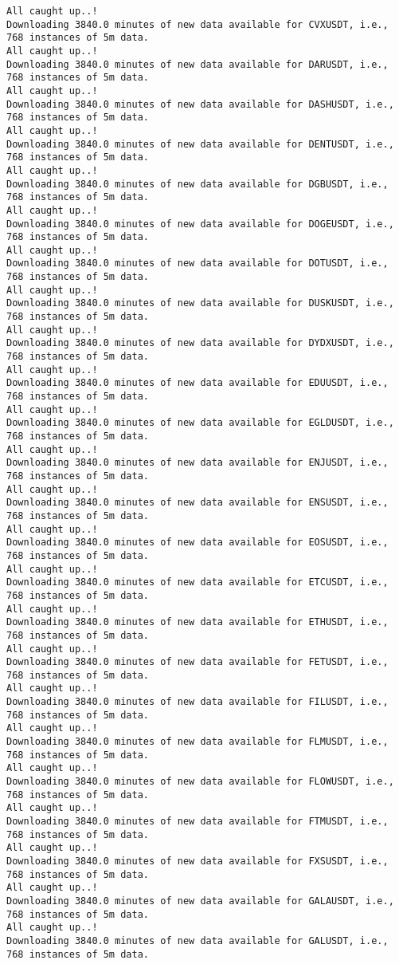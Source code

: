 \documentclass[
  letterpaper,
  DIV=11,
  numbers=noendperiod]{scrartcl}
\begin{document}
\begin{verbatim}
All caught up..!
Downloading 3840.0 minutes of new data available for CVXUSDT, i.e., 768 instances of 5m data.
All caught up..!
Downloading 3840.0 minutes of new data available for DARUSDT, i.e., 768 instances of 5m data.
All caught up..!
Downloading 3840.0 minutes of new data available for DASHUSDT, i.e., 768 instances of 5m data.
All caught up..!
Downloading 3840.0 minutes of new data available for DENTUSDT, i.e., 768 instances of 5m data.
All caught up..!
Downloading 3840.0 minutes of new data available for DGBUSDT, i.e., 768 instances of 5m data.
All caught up..!
Downloading 3840.0 minutes of new data available for DOGEUSDT, i.e., 768 instances of 5m data.
All caught up..!
Downloading 3840.0 minutes of new data available for DOTUSDT, i.e., 768 instances of 5m data.
All caught up..!
Downloading 3840.0 minutes of new data available for DUSKUSDT, i.e., 768 instances of 5m data.
All caught up..!
Downloading 3840.0 minutes of new data available for DYDXUSDT, i.e., 768 instances of 5m data.
All caught up..!
Downloading 3840.0 minutes of new data available for EDUUSDT, i.e., 768 instances of 5m data.
All caught up..!
Downloading 3840.0 minutes of new data available for EGLDUSDT, i.e., 768 instances of 5m data.
All caught up..!
Downloading 3840.0 minutes of new data available for ENJUSDT, i.e., 768 instances of 5m data.
All caught up..!
Downloading 3840.0 minutes of new data available for ENSUSDT, i.e., 768 instances of 5m data.
All caught up..!
Downloading 3840.0 minutes of new data available for EOSUSDT, i.e., 768 instances of 5m data.
All caught up..!
Downloading 3840.0 minutes of new data available for ETCUSDT, i.e., 768 instances of 5m data.
All caught up..!
Downloading 3840.0 minutes of new data available for ETHUSDT, i.e., 768 instances of 5m data.
All caught up..!
Downloading 3840.0 minutes of new data available for FETUSDT, i.e., 768 instances of 5m data.
All caught up..!
Downloading 3840.0 minutes of new data available for FILUSDT, i.e., 768 instances of 5m data.
All caught up..!
Downloading 3840.0 minutes of new data available for FLMUSDT, i.e., 768 instances of 5m data.
All caught up..!
Downloading 3840.0 minutes of new data available for FLOWUSDT, i.e., 768 instances of 5m data.
All caught up..!
Downloading 3840.0 minutes of new data available for FTMUSDT, i.e., 768 instances of 5m data.
All caught up..!
Downloading 3840.0 minutes of new data available for FXSUSDT, i.e., 768 instances of 5m data.
All caught up..!
Downloading 3840.0 minutes of new data available for GALAUSDT, i.e., 768 instances of 5m data.
All caught up..!
Downloading 3840.0 minutes of new data available for GALUSDT, i.e., 768 instances of 5m data.

\end{verbatim}
\end{document}
